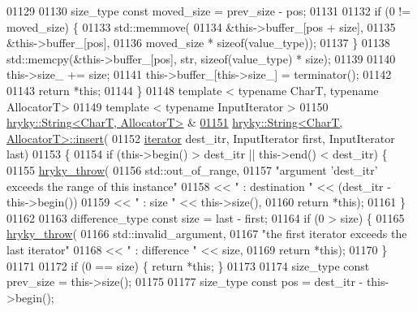 \begin{DoxyCode}
01129 
01130     size\_type \textcolor{keyword}{const} moved\_size = prev\_size - pos;
01131 
01132     \textcolor{keywordflow}{if} (0 != moved\_size) \{
01133         std::memmove(
01134             &this->buffer\_[pos + size],
01135             &this->buffer\_[pos],
01136             moved\_size * \textcolor{keyword}{sizeof}(value\_type));
01137     \}
01138     std::memcpy(&this->buffer\_[pos], str, \textcolor{keyword}{sizeof}(value\_type) * size);
01139     
01140     this->size\_ += size;
01141     this->buffer\_[this->size\_] = terminator();
01142 
01143     \textcolor{keywordflow}{return} *\textcolor{keyword}{this};
01144 \}
01148 \textcolor{keyword}{template} < \textcolor{keyword}{typename} CharT, \textcolor{keyword}{typename} AllocatorT>
01149 \textcolor{keyword}{template} < \textcolor{keyword}{typename} InputIterator >
01150 \hyperlink{classhryky_1_1_string}{hryky::String<CharT, AllocatorT>} &
\hypertarget{string_8h_source_l01151}{}\hyperlink{classhryky_1_1_string_a11c90b922251a14dfd64beae2edb0906}{01151} \hyperlink{classhryky_1_1_string}{hryky::String<CharT, AllocatorT>::insert}(
01152     \hyperlink{classhryky_1_1iterator_1_1random_1_1_mutable}{iterator} dest\_itr, InputIterator first, InputIterator last)
01153 \{
01154     \textcolor{keywordflow}{if} (this->begin() > dest\_itr || this->end() < dest\_itr) \{
01155         \hyperlink{debug__common_8h_af50606eac4009921527ddcaed392b2c2}{hryky_throw}(
01156             std::out\_of\_range,
01157             \textcolor{stringliteral}{"argument 'dest\_itr' exceeds the range of this instance"}
01158             << \textcolor{stringliteral}{" : destination "} << (dest\_itr - this->begin())
01159             << \textcolor{stringliteral}{" : size "} << this->size(),
01160             \textcolor{keywordflow}{return} *\textcolor{keyword}{this});
01161     \}
01162 
01163     difference\_type \textcolor{keyword}{const} size = last - first;
01164     \textcolor{keywordflow}{if} (0 > size) \{
01165         \hyperlink{debug__common_8h_af50606eac4009921527ddcaed392b2c2}{hryky_throw}(
01166             std::invalid\_argument,
01167             \textcolor{stringliteral}{"the first iterator exceeds the last iterator"}
01168             << \textcolor{stringliteral}{" : difference "} << size,
01169             \textcolor{keywordflow}{return} *\textcolor{keyword}{this});
01170     \}
01171 
01172     \textcolor{keywordflow}{if} (0 == size) \{ \textcolor{keywordflow}{return} *\textcolor{keyword}{this}; \}
01173 
01174     size\_type \textcolor{keyword}{const} prev\_size = this->size();
01175 
01177     size\_type \textcolor{keyword}{const} pos = dest\_itr - this->begin();

\end{DoxyCode}
